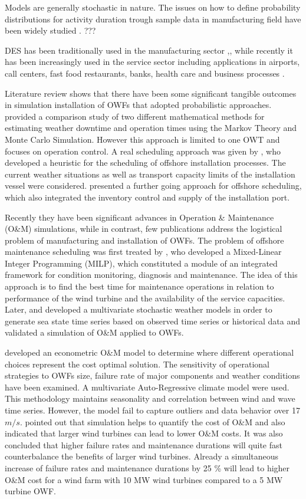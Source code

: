 Models are generally stochastic in nature. The issues on how to define probability distributions for activity duration trough sample data in manufacturing field have been widely studied \cite{}. ???

DES has been traditionally used in the manufacturing sector \cite{KhedriLiraviasl20151490} ,\cite{Yeong2014}, while recently it has been increasingly used in the service sector including applications in airports, call centers, fast food restaurants, banks, health care \cite{Chemweno201445} and business processes \cite{ Khodyrev2014322}.

Literature review shows that there have been some significant tangible outcomes in simulation installation of OWFs that adopted probabilistic approaches. \cite{Tyapin2011} provided a comparison study of two different mathematical methods for estimating weather downtime and operation times using the Markov Theory and Monte Carlo Simulation. However this approach is limited to one OWT and focuses on operation control. A real scheduling approach was given by \cite{Scholz2010}, who developed a heuristic for the scheduling of offshore installation processes. The current weather situations as well as transport capacity limits of the installation vessel were considered. \cite{ISOPE2012} presented a further going approach for offshore scheduling, which also integrated the inventory control and supply of the installation port.

Recently they have been significant advances in Operation \& Maintenance (O\&M) simulations, while in contrast, few publications address the logistical problem of manufacturing and installation of OWFs. The problem of offshore maintenance scheduling was first treated by \cite{Kovacs2011497}, who developed a Mixed-Linear Integer Programming (MILP), which constituted a module of an integrated framework for condition monitoring, diagnosis and maintenance. The idea of this approach is to find the best time for maintenance operations in relation to performance of the wind turbine and the availability of the service capacities. Later, \cite{scheu2012} and \cite{Hagen2013} developed a multivariate stochastic weather models in order to generate sea state time series based on observed time series or historical data and validated a simulation of O\&M applied to OWFs.

\cite{dinwoodie2013} developed an econometric O\&M model to determine where different operational choices represent the cost optimal solution. The sensitivity of operational strategies to OWFs size, failure rate of major components and weather conditions have been examined. A multivariate Auto-Regressive climate model were used. This methodology maintains seasonality and correlation between wind and wave time series. However, the model fail to capture outliers and data behavior over 17 $m/s$. \cite{Hofmann2014} pointed out that simulation helps to quantify the cost of O\&M and also indicated that larger wind turbines can lead to lower O\&M costs. It was also concluded that higher failure rates and maintenance durations will quite fast counterbalance the benefits of larger wind turbines. Already a simultaneous increase of failure rates and maintenance durations by 25 \% will lead to higher O\&M cost for a wind farm with 10 MW wind turbines compared to a 5 MW turbine OWF. 
